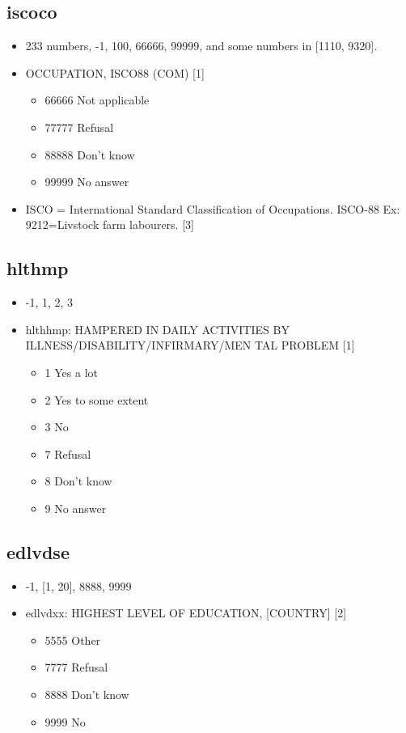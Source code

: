 \documentclass[12pt]{article}
\begin{document}
\subsection{iscoco}
\begin{itemize}
\item 233 numbers, -1, 100, 66666, 99999, and some numbers in [1110, 9320].
\item OCCUPATION, ISCO88 (COM) [1]
\begin{itemize}
\item 66666 Not applicable 
\item 77777 Refusal
\item 88888 Don’t know 
\item 99999 No answer 
\end{itemize}
\item
ISCO = International Standard Classification of Occupations. ISCO-88
Ex: 9212=Livstock farm labourers. [3]
\end{itemize}

\subsection{hlthmp}
\begin{itemize}
\item -1, 1, 2, 3
\item hlthhmp: HAMPERED IN DAILY ACTIVITIES BY ILLNESS/DISABILITY/INFIRMARY/MEN
TAL PROBLEM [1]
\begin{itemize}
\item 1 Yes a lot 
\item 2 Yes to some extent 
\item 3 No                                                          
\item 7 Refusal                                            
\item 8 Don’t know 
\item 9 No answer 
\end{itemize}
\end{itemize}

\subsection{edlvdse}
\begin{itemize}
\item -1, [1, 20], 8888, 9999
\item edlvdxx: HIGHEST LEVEL OF EDUCATION, [COUNTRY] [2]
\begin{itemize}
\item 5555 Other
\item 7777 Refusal
\item 8888 Don’t know                                
\item 9999 No              
\end{itemize}
\end{itemize}
\end{document}
